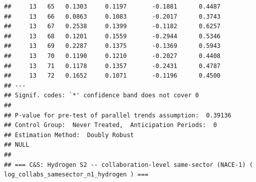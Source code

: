 \documentclass[
]{article}
\begin{document}
\begin{verbatim}
##     13   65   0.1303     0.1197       -0.1881      0.4487  
##     13   66   0.0863     0.1083       -0.2017      0.3743  
##     13   67   0.2538     0.1399       -0.1182      0.6257  
##     13   68   0.1201     0.1559       -0.2944      0.5346  
##     13   69   0.2287     0.1375       -0.1369      0.5943  
##     13   70   0.1190     0.1210       -0.2027      0.4408  
##     13   71   0.1178     0.1357       -0.2431      0.4787  
##     13   72   0.1652     0.1071       -0.1196      0.4500  
## ---
## Signif. codes: `*' confidence band does not cover 0
## 
## P-value for pre-test of parallel trends assumption:  0.39136
## Control Group:  Never Treated,  Anticipation Periods:  0
## Estimation Method:  Doubly Robust
## NULL
## 
## === C&S: Hydrogen S2 -- collaboration-level same-sector (NACE-1) ( log_collabs_samesector_n1_hydrogen ) ===
\end{verbatim}
\end{document}
